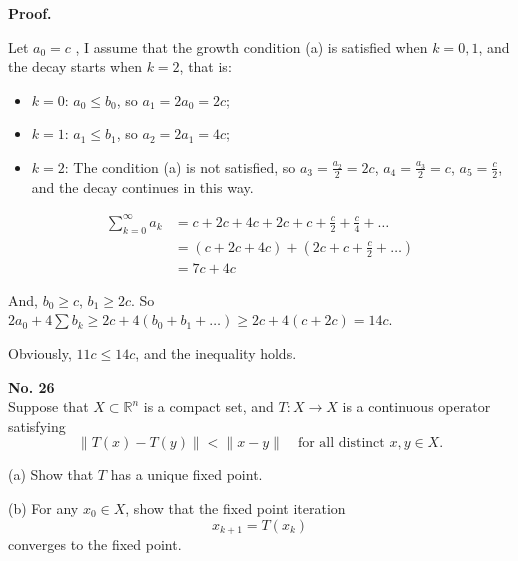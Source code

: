 \documentclass[a4paper, 11pt]{article}
\newenvironment{problem}[2][No.]
    { \begin{mdframed}[backgroundcolor=gray!5] \textbf{#1 #2} \\}
    {  \end{mdframed}}
\newenvironment{solution}
    {\textbf{Proof.}}
    {}
\begin{document}
\begin{solution}

Let \( a_0 = c \) , I assume that the growth condition (a) is satisfied when \( k = 0, 1 \), and the decay starts when \( k = 2 \), that is:
\begin{itemize}
	\item \( k = 0 \): \( a_0 \leq b_0 \), so \( a_1 = 2a_0 = 2c \);
	\item \( k = 1 \): \( a_1 \leq b_1 \), so \( a_2 = 2a_1 = 4c \); 
	\item \( k = 2 \): The condition (a) is not satisfied, so \( a_3=\frac{a_2}{2} = 2c \), \( a_4=\frac{a_3}{2}=c \), \( a_5 = \frac{c}{2} \), and the decay continues in this way. 
\end{itemize}
$$
\begin{aligned}
	\sum_{k = 0}^{\infty} a_k &= c + 2c + 4c + 2c + c + \frac{c}{2} + \frac{c}{4} + \dots \\
	&= (c + 2c + 4c) + \left(2c + c + \frac{c}{2} + \dots\right) \\
	&= 7c + 4c 
\end{aligned}
$$

And, \( b_0 \geq c \), \( b_1 \geq 2c \). So \( 2a_0 + 4\sum b_k \geq 2c + 4(b_0 + b_1 + \dots) \geq 2c + 4(c + 2c) = 14c \). 

Obviously, \( 11c \leq 14c \), and the inequality holds.

\end{solution} 

\begin{problem}{26}
	Suppose that \( X \subset \mathbb{R}^n \) is a compact set, and \( T : X \to X \) is a continuous operator satisfying
	$$
	\| T(x) - T(y) \| < \| x - y \| \quad \text{for all distinct } x, y \in X.
	$$
	
	(a) Show that \( T \) has a unique fixed point.
	
	(b) For any \( x_0 \in X \), show that the fixed point iteration
	$$
	x_{k + 1} = T(x_k)
	$$
	converges to the fixed point.
\end{problem}
\end{document}
